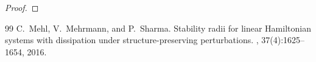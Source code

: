 \documentclass[10pt,a4paper]{amsart}
\begin{document}
\begin{proof}
\end{proof}

\begin{thebibliography}{99}
 C.~Mehl, V.~Mehrmann, and P.~Sharma. \newblock Stability radii for linear {H}amiltonian systems with dissipation under structure-preserving perturbations. , 37(4):1625--1654, 2016.
\end{thebibliography}
\end{document}
